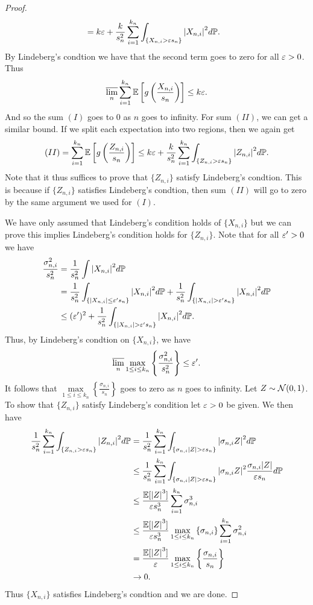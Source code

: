 \begin{proof}
\begin{align*}
    &= k\varepsilon + \frac{k}{s_n^2}\sum_{i=1}^{k_n}\int_{\{X_{n,i}  > \varepsilon s_n \}}{\left\lvert X_{n,i}\right\rvert}^2d{\mathbb{P}}.
\end{align*}
By Lindeberg's condtion we have that the second term goes to zero for all $\varepsilon > 0$. Thus
\[\overline{\lim_n}\sum_{i=1}^{k_n} {\mathbb{E}}\left[g\left(\frac{X_{n,i}}{s_n}\right)\right] \le k\varepsilon.  \]
And so the sum $(I)$ goes to 0 as $n$ goes to infinity. For sum $(II)$, we can get a similar bound. If we split each expectation into two regions, then we again get
\[(II) = \sum_{i=1}^{k_n}{\mathbb{E}}\left[g\left(\frac{Z_{n,i}}{s_n}\right)\right] \le k\varepsilon + \frac{k}{s_n^2}\sum_{i=1}^{k_n}\int_{\{Z_{n,i}  > \varepsilon s_n \}}{\left\lvert Z_{n,i}\right\rvert}^2d{\mathbb{P}}.\]
Note that it thus suffices to prove that $\{Z_{n,i}\}$ satisfy Lindeberg's condtion. This is because if $\{Z_{n,i}\}$ satisfies Lindeberg's condtion, then sum $(II)$ will go to zero by the same argument we used for $(I)$. 

We have only assumed that Lindeberg's condition holds of $\{X_{n,i}\}$ but we can prove this implies Lindeberg's condition holds for $\{Z_{n,i}\}$. Note that for all $\varepsilon' > 0$ we have 
\begin{align*}
    \frac{\sigma_{n,i}^2}{s_n^2} &= \frac{1}{s_n^2}\int {\left\lvert X_{n,i}\right\rvert}^2 d{\mathbb{P}} \\
    &= \frac{1}{s_n^2}\int_{\{{\left\lvert X_{n,i}\right\rvert}\le\varepsilon' s_n\}}{\left\lvert X_{n,i}\right\rvert}^2d{\mathbb{P}}+\frac{1}{s_n^2} \int_{\{{\left\lvert X_{n,i}\right\rvert}>\varepsilon' s_n\}} {\left\lvert X_{n,i}\right\rvert}^2 d{\mathbb{P}}\\
    &\le (\varepsilon')^2+\frac{1}{s_n^2} \int_{\{{\left\lvert X_{n,i}\right\rvert}>\varepsilon' s_n\}} {\left\lvert X_{n,i}\right\rvert}^2 d{\mathbb{P}}.
\end{align*}
Thus, by Lindeberg's condtion on $\{X_{n,i}\}$, we have
\[\overline{\lim_n} \max_{1 \le i \le k_n}\left\{\frac{\sigma_{n,i}^2}{s_n^2}\right\} \le \varepsilon'. \]
It follows that $\max\limits_{1\le i \le k_n} \left\{\frac{\sigma_{n,i}}{s_n}\right\}$ goes to zero as $n$ goes to infinity. Let $Z \sim {{\mathcal{N}}}(0,1)$. To show that $\{Z_{n,i}\}$ satisfy Lindeberg's condition let $\varepsilon > 0$ be given. We then have
\begin{align*}
    \frac{1}{s_n^2}\sum_{i=1}^{k_n} \int_{\{Z_{n,i}  > \varepsilon s_n \}}{\left\lvert Z_{n,i}\right\rvert}^2d{\mathbb{P}}&=\frac{1}{s_n^2}\sum_{i=1}^{k_n} \int_{\{\sigma_{n,i}{\left\lvert Z\right\rvert}  > \varepsilon s_n \}}{\left\lvert\sigma_{n,i}Z\right\rvert}^2d{\mathbb{P}}\\
    &\le \frac{1}{s_n^2}\sum_{i=1}^{k_n} \int_{\{\sigma_{n,i}{\left\lvert Z\right\rvert}  > \varepsilon s_n \}}{\left\lvert\sigma_{n,i}Z\right\rvert}^2\frac{\sigma_{n,i}{\left\lvert Z\right\rvert}}{\varepsilon s_n}d{\mathbb{P}}\\
    &\le \frac{{\mathbb{E}}[{\left\lvert Z\right\rvert}^3]}{\varepsilon s_n^3}\sum_{i=1}^{k_n} \sigma_{n,i}^3\\
    &\le \frac{{\mathbb{E}}[{\left\lvert Z\right\rvert}^3]}{\varepsilon s_n^3}\max_{1 \le i \le k_n}\left\{\sigma_{n,i}\right\}\sum_{i=1}^{k_n} \sigma_{n,i}^2\\
    &=  \frac{{\mathbb{E}}[{\left\lvert Z\right\rvert}^3]}{\varepsilon}\max_{1 \le i \le k_n}\left\{\frac{\sigma_{n,i}}{s_n}\right\}\\
    &\to 0.
\end{align*}
Thus $\{X_{n,i}\}$ satisfies Lindeberg's condtion and we are done.
\end{proof}
